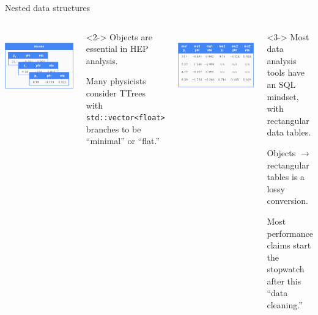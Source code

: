 \documentclass[aspectratio=169]{beamer}
\begin{document}
\begin{frame}{Nested data structures}
\large
\vspace{0.5 cm}
\begin{columns}[t]
\mbox{ } \hfill \includegraphics[width=0.75\linewidth]{muons-as-objects.png} \hfill \mbox{ }

\vspace{0.25 cm}
\begin{uncoverenv}<2->
Objects are essential in HEP analysis.

\vspace{0.25 cm}
Many physicists consider TTrees with {\tt\small std::vector<float>} branches to be ``minimal'' or ``flat.''
\end{uncoverenv}

\mbox{ } \hfill \includegraphics[width=0.75\linewidth]{muons-as-a-table.png} \hfill \mbox{ }

\vspace{0.25 cm}
\begin{uncoverenv}<3->
Most data analysis tools have an SQL mindset, with rectangular data tables.

\vspace{0.25 cm}
Objects $\to$ rectangular tables is a lossy conversion.

\vspace{0.25 cm}
Most performance claims start the stopwatch after this ``data cleaning.''
\end{uncoverenv}
\end{columns}
\end{frame}
\end{document}
